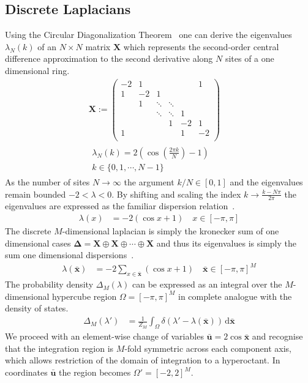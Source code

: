 \documentclass{article}[12pt]
\numberwithin{equation}{section}
\begin{document}
\subsection{Discrete Laplacians}
Using the Circular Diagonalization Theorem~\cite{} one can derive the
eigenvalues $\lambda_N(k)$ of an $N\times N$ matrix $\mathbf X$ which
represents the second-order central difference approximation to the
second derivative along $N$ sites of a one dimensional ring.
\begin{align}
  \mathbf X :=
  \begin{pmatrix}
    -2 & 1 &  &  &  & 1 \\
    1 & -2 & 1 &  &  &  \\
    & 1 & \ddots & \ddots &  & \\
    & & \ddots & \ddots & 1 & \\
    & & & 1 & -2 & 1 \\
    1 & & & & 1 & -2 \\
  \end{pmatrix}\\
  \begin{matrix}
    \lambda_N(k)=2\left(\cos\left(\frac{2\pi k}{N}\right)-1\right) \\
    k\in\{0,1,\cdots,N-1\}
  \end{matrix}
  \qquad
\end{align}
As the number of sites $N\rightarrow\infty$ the argument $k/N\in[0,1]$
and the eigenvalues remain bounded $-2<\lambda<0$. By shifting and scaling
the index $k\rightarrow\frac{k-N\pi}{2\pi}$ the eigenvalues are expressed as
the familiar dispersion relation~\cite{}.
\begin{align}
  \lambda(x)&=
  -2\left(\cos x+1\right)
  \quad x\in[-\pi,\pi]
\end{align}
The discrete $M$-dimensional laplacian is simply the kronecker sum of one
dimensional cases $\mathbf\Delta=\mathbf X\oplus\mathbf X\oplus\cdots\oplus\mathbf X$
and thus its eigenvalues is simply the sum one dimensional dispersions~\cite{}.
\begin{align}
  \lambda(\bar{\mathbf{x}})&=
  -2\sum_{x\in\bar{\mathbf{x}}}\left(\cos x+1\right)
  \quad \bar{\mathbf{x}}\in[-\pi,\pi]^M
\end{align}
The probability density $\Delta_M(\lambda)$ can be expressed as an integral
over the $M$-dimensional hypercube region $\Omega=[-\pi,\pi]^M$ in complete
analogue with the density of states.
\begin{align}
  \Delta_M(\lambda')&=\frac{1}{Z_M}\int_{\Omega}\!\delta(\lambda'-\lambda(\bar{\mathbf{x}}))\,\mathrm{d}\bar{\mathbf{x}}
\end{align}
We proceed with an element-wise change of variables $\bar{\mathbf{u}}=2\cos \bar{\mathbf{x}}$ and
recognise that the integration region is $M$-fold symmetric across each
component axis, which allows restriction of the domain of integration to a
hyperoctant. In coordinates $\bar{\mathbf{u}}$ the region becomes $\Omega'=[-2,2]^M$.
\end{document}
